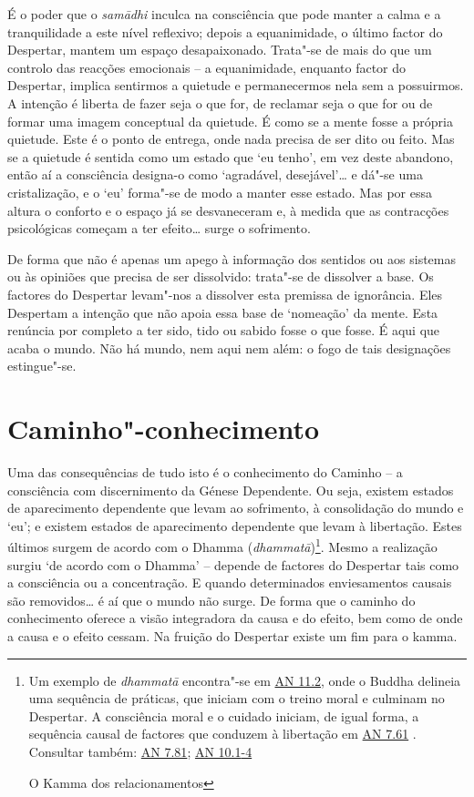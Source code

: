 É o poder que o \emph{samādhi} inculca na consciência que pode manter a calma e a tranquilidade a este nível reflexivo; depois a equanimidade, o último factor do Despertar, mantem um espaço desapaixonado. Trata"-se de mais do que um controlo das reacções emocionais -- a equanimidade, enquanto factor do Despertar, implica sentirmos a quietude e permanecermos nela sem a possuirmos. A intenção é liberta de fazer seja o que for, de reclamar seja o que for ou de formar uma imagem conceptual da quietude. É como se a mente fosse a própria quietude. Este é o ponto de entrega, onde nada precisa de ser dito ou feito. Mas se a quietude é sentida como um estado que `eu tenho', em vez deste abandono, então aí a consciência designa-o como `agradável, desejável'\ldots{} e dá"-se uma cristalização, e o `eu' forma"-se de modo a manter esse estado. Mas por essa altura o conforto e o espaço já se desvaneceram e, à medida que as contracções psicológicas começam a ter efeito\ldots{} surge o sofrimento.

De forma que não é apenas um apego à informação dos sentidos ou aos sistemas ou às opiniões que precisa de ser dissolvido: trata"-se de dissolver a base. Os factores do Despertar levam"-nos a dissolver esta premissa de ignorância. Eles Despertam a intenção que não apoia essa base de `nomeação' da mente. Esta renúncia por completo a ter sido, tido ou sabido fosse o que fosse. É aqui que acaba o mundo. Não há mundo, nem aqui nem além: o fogo de tais designações estingue"-se.

\section{Caminho"-conhecimento}

Uma das consequências de tudo isto é o conhecimento do Caminho -- a consciência com discernimento da Génese Dependente. Ou seja, existem estados de aparecimento dependente que levam ao sofrimento, à consolidação do mundo e `eu'; e existem estados de aparecimento dependente que levam à libertação. Estes últimos surgem de acordo com o Dhamma (\emph{dhammatā})\footnote{Um exemplo de \emph{dhammatā} encontra"-se em \href{https://suttacentral.net/an11.2/en/thanissaro}{AN 11.2}, onde o Buddha delineia uma sequência de práticas, que iniciam com o treino moral e culminam no Despertar. A consciência moral e o cuidado iniciam, de igual forma, a sequência causal de factores que conduzem à libertação em \href{https://suttacentral.net/an7.65/en/sujato}{AN 7.61} . Consultar também: \href{https://suttacentral.net/an7.81/en/sujato}{AN 7.81}; \href{https://suttacentral.net/an10.1/en/bodhi}{AN 10.1}\href{https://suttacentral.net/an10.2/en/bodhi}{-4}

  O Kamma dos relacionamentos}. Mesmo a realização surgiu `de acordo com o Dhamma' -- depende de factores do Despertar tais como a consciência ou a concentração. E quando determinados enviesamentos causais são removidos\ldots{} é aí que o mundo não surge. De forma que o caminho do conhecimento oferece a visão integradora da causa e do efeito, bem como de onde a causa e o efeito cessam. Na fruição do Despertar existe um fim para o kamma.

